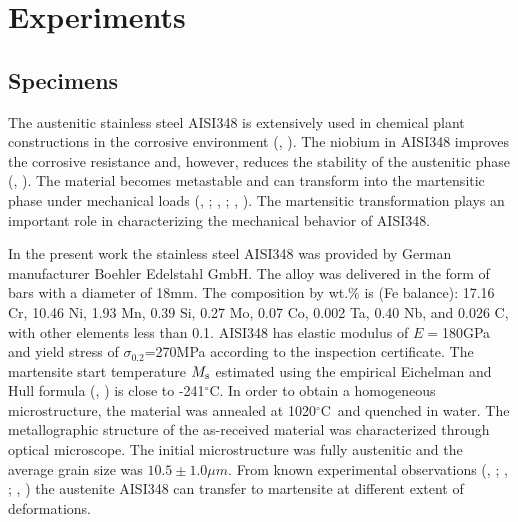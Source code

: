 \documentclass[final,5p,times,onecolumn,10pt,sort&compress]{elsarticle}
\newcommand{\degreeC}{{$^\circ$C}}
\begin{document}
\section{Experiments}

\subsection{Specimens}

The austenitic stainless steel AISI348 is extensively used in chemical plant constructions in the corrosive environment  (\citeauthor{Nebel2003Cyclic}, \citeyear{Nebel2003Cyclic}). The niobium in AISI348 improves the corrosive resistance and, however, reduces the stability of the austenitic phase  (\citeauthor{Hahnenberger2014Microstructural}, \citeyear{Hahnenberger2014Microstructural}). The material becomes metastable and can transform into the martensitic phase under mechanical loads (\citeauthor{Smaga2008Deformation}, \citeyear{Smaga2008Deformation}; \citeauthor{Nebel2003Cyclic}, \citeyear{Nebel2003Cyclic}; \citeauthor{Hahnenberger2014Microstructural}, \citeyear{Hahnenberger2014Microstructural}). The martensitic transformation plays an important role in characterizing the mechanical behavior of AISI348.

In the present work the stainless steel  AISI348 was provided by German manufacturer Boehler Edelstahl GmbH. The alloy was delivered in the form of bars with a diameter of 18mm. The composition by wt.\% is (Fe balance): 17.16 Cr, 10.46 Ni, 1.93 Mn, 0.39 Si, 0.27 Mo, 0.07 Co, 0.002 Ta, 0.40 Nb, and 0.026 C, with other elements less than 0.1. AISI348 has elastic modulus of $E=$180GPa and yield stress of $\sigma _{0.2}$=270MPa according to the inspection certificate. The martensite start temperature $M_{\rm s}$ estimated using the empirical Eichelman and Hull formula (\citeauthor{Eichelman}, \citeyear{Eichelman}) is close to -241\degreeC. In order to obtain a homogeneous microstructure, the material was annealed at 1020\degreeC~and quenched in water. The metallographic structure of the as-received material was characterized through optical microscope. The initial microstructure was fully austenitic and the average grain size was $10.5\pm1.0 \mu m$. From known experimental observations (\citeauthor{Smaga2008Deformation}, \citeyear{Smaga2008Deformation}; \citeauthor{Nebel2003Cyclic}, \citeyear{Nebel2003Cyclic}; \citeauthor{Hahnenberger2014Microstructural}, \citeyear{Hahnenberger2014Microstructural}) the austenite AISI348 can transfer to martensite at different extent of deformations.
\end{document}
